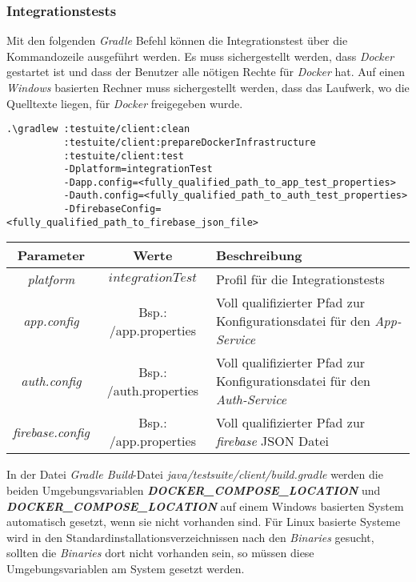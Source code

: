 \documentclass[]{article}
\begin{document}
{{{\subsubsection{Integrationstests}
Mit den folgenden \emph{Gradle} Befehl können die Integrationstest über die Kommandozeile ausgeführt werden. Es muss sichergestellt werden, dass \emph{Docker} gestartet ist und dass der Benutzer alle nötigen Rechte für \emph{Docker} hat. Auf einen \emph{Windows} basierten Rechner muss sichergestellt werden, dass das Laufwerk, wo die Quelltexte liegen, für \emph{Docker} freigegeben wurde. 
\begin{verbatim}
.\gradlew :testuite/client:clean 
          :testuite/client:prepareDockerInfrastructure 
          :testuite/client:test
          -Dplatform=integrationTest
          -Dapp.config=<fully_qualified_path_to_app_test_properties> 
          -Dauth.config=<fully_qualified_path_to_auth_test_properties> 
          -DfirebaseConfig=<fully_qualified_path_to_firebase_json_file>
\end{verbatim}
{\renewcommand{\arraystretch}{2}%
\begin{center}
	\begin{tabular}{| c | c | p{8.3cm} |}
		\hline
		\textbf{Parameter} & \textbf{Werte} & \textbf{Beschreibung}  \\ \hline
		\textit{platform} & $integrationTest$ & Profil für die Integrationstests\\ \hline
		\textit{app.config} & Bsp.: /app.properties & Voll qualifizierter Pfad zur Konfigurationsdatei für den \emph{App-Service}  \\ \hline
		\textit{auth.config} & Bsp.: /auth.properties & Voll qualifizierter Pfad zur Konfigurationsdatei für den \emph{Auth-Service}  \\ \hline
		\textit{firebase.config} & Bsp.: /app.properties & Voll qualifizierter Pfad zur 
		\emph{firebase} JSON Datei  \\ \hline
	\end{tabular}
\end{center}
In der Datei \emph{Gradle Build}-Datei \emph{java/testsuite/client/build.gradle} werden die beiden Umgebungsvariablen \textbf{\emph{DOCKER\_COMPOSE\_LOCATION}} und  \textbf{\emph{DOCKER\_COMPOSE\_LOCATION}} auf einem Windows basierten System automatisch gesetzt, wenn sie nicht vorhanden sind. Für Linux basierte Systeme wird in den Standardinstallationsverzeichnissen nach den \emph{Binaries} gesucht, sollten die \emph{Binaries} dort nicht vorhanden sein, so müssen diese Umgebungsvariablen am System gesetzt werden. 
\newpage

}}}}
\end{document}
